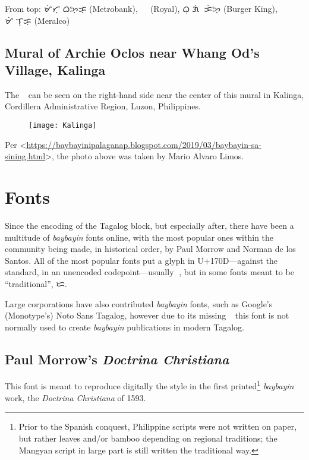 \documentclass[a4paper,pagesize,openany,14pt,parskip=never]{scrbook}
\newcommand{\≈}{$\approx$}
\newcommand{\ra}{{\baybayin ᜍ}}
\begin{document}
From top: {\baybayin ᜋᜒᜆ᜔ᜍᜓᜊᜅ᜔ᜃ᜔} (Metrobank), {\baybayin ᜍᜓᜌᜎ᜔} (Royal), {\baybayin ᜊᜓᜍ᜔ᜄᜒᜍ᜔ ᜃᜒᜅ᜔} (Burger King), {\baybayin ᜋᜒᜍᜎ᜔ᜃᜓ} (Meralco)

\subsection{Mural of Archie Oclos near Whang Od's Village, Kalinga}

The \ra\ can be seen on the right-hand side near the center of this mural in Kalinga, Cordillera Administrative Region, Luzon, Philippines.

\begin{figure}[H]
\texttt{[image: Kalinga]}
\end{figure}

Per <\url{https://baybayinipalaganap.blogspot.com/2019/03/baybayin-sa-sining.html}>, the photo above was taken by Mario Alvaro Limos.

\section{Fonts}
\label{Fonts}

Since the encoding of the Tagalog block, but especially after, there have been a multitude of {\em baybayin} fonts online, with the most popular ones within the community being made, in historical order, by Paul Morrow and Norman de los Santos. All of the most popular fonts put a glyph in U+170D---against the standard, in an unencoded codepoint---usually \ra, but in some fonts meant to be ``traditional'', {\baybayin ᜇ}.

Large corporations have also contributed {\em baybayin} fonts, such as Google's (Monotype's) Noto Sans Tagalog, however due to its missing \ra\ this font is not normally used to create {\em baybayin} publications in modern Tagalog.

\subsection{Paul Morrow's {\em Doctrina Christiana}}

This font is meant to reproduce digitally the style in the first printed\footnote{Prior to the Spanish conquest, Philippine scripts were not written on paper, but rather leaves and/or bamboo depending on regional traditions; the Mangyan script in large part is still written the traditional way.} {\em baybayin} work, the {\em Doctrina Christiana} of 1593.
\end{document}
